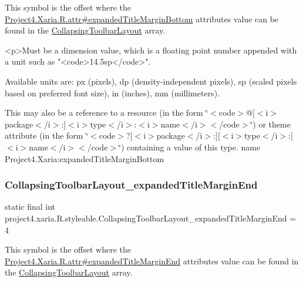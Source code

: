 This symbol is the offset where the \hyperlink{}{Project4.\+Xaria.\+R.\+attr\#expanded\+Title\+Margin\+Bottom} attribute\textquotesingle{}s value can be found in the \hyperlink{classproject4_1_1xaria_1_1R_1_1styleable_ac131ed2b7e0e7f05b58231242478b839}{Collapsing\+Toolbar\+Layout} array.

\begin{DoxyVerb}      <p>Must be a dimension value, which is a floating point number appended with a unit such as "<code>14.5sp</code>".
\end{DoxyVerb}
 Available units are\+: px (pixels), dp (density-\/independent pixels), sp (scaled pixels based on preferred font size), in (inches), mm (millimeters). 

This may also be a reference to a resource (in the form \char`\"{}$<$code$>$@\mbox{[}$<$i$>$package$<$/i$>$\+:\mbox{]}$<$i$>$type$<$/i$>$\+:$<$i$>$name$<$/i$>$$<$/code$>$\char`\"{}) or theme attribute (in the form \char`\"{}$<$code$>$?\mbox{[}$<$i$>$package$<$/i$>$\+:\mbox{]}\mbox{[}$<$i$>$type$<$/i$>$\+:\mbox{]}$<$i$>$name$<$/i$>$$<$/code$>$\char`\"{}) containing a value of this type.  name Project4.\+Xaria\+:expanded\+Title\+Margin\+Bottom \mbox{\label{classproject4_1_1xaria_1_1R_1_1styleable_add3700a4da95b0e9fe9cc81beada966b}} 
\subsubsection{\texorpdfstring{Collapsing\+Toolbar\+Layout\+\_\+expanded\+Title\+Margin\+End}{CollapsingToolbarLayout\_expandedTitleMarginEnd}}
{\footnotesize\ttfamily static final int project4.\+xaria.\+R.\+styleable.\+Collapsing\+Toolbar\+Layout\+\_\+expanded\+Title\+Margin\+End = 4\hspace{0.3cm}{\ttfamily [static]}}

This symbol is the offset where the \hyperlink{}{Project4.\+Xaria.\+R.\+attr\#expanded\+Title\+Margin\+End} attribute\textquotesingle{}s value can be found in the \hyperlink{classproject4_1_1xaria_1_1R_1_1styleable_ac131ed2b7e0e7f05b58231242478b839}{Collapsing\+Toolbar\+Layout} array.


